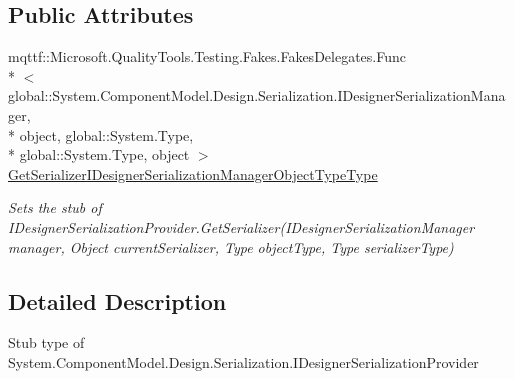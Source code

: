 \subsection*{Public Attributes}
\begin{DoxyCompactItemize}
\item 
mqttf\-::\-Microsoft.\-Quality\-Tools.\-Testing.\-Fakes.\-Fakes\-Delegates.\-Func\\*
$<$ global\-::\-System.\-Component\-Model.\-Design.\-Serialization.\-I\-Designer\-Serialization\-Manager, \\*
object, global\-::\-System.\-Type, \\*
global\-::\-System.\-Type, object $>$ \hyperlink{class_system_1_1_component_model_1_1_design_1_1_serialization_1_1_fakes_1_1_stub_i_designer_serialization_provider_a4f5258ddad167e4becb001acbdac35f3}{Get\-Serializer\-I\-Designer\-Serialization\-Manager\-Object\-Type\-Type}
\begin{DoxyCompactList}\small\item\em Sets the stub of I\-Designer\-Serialization\-Provider.\-Get\-Serializer(\-I\-Designer\-Serialization\-Manager manager, Object current\-Serializer, Type object\-Type, Type serializer\-Type)\end{DoxyCompactList}\end{DoxyCompactItemize}


\subsection{Detailed Description}
Stub type of System.\-Component\-Model.\-Design.\-Serialization.\-I\-Designer\-Serialization\-Provider



